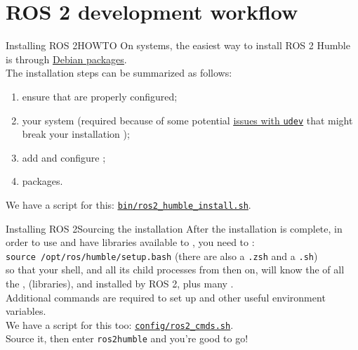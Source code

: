 
\section{ROS 2 development workflow}
\graphicspath{{figs/section1/}}

\begin{frame}{Installing ROS 2}{HOWTO}
  On  systems, the easiest way to install ROS 2 Humble is through \href{https://docs.ros.org/en/humble/Installation/Ubuntu-Install-Debians.html}{\color{blue}\underline{Debian packages}}.\\
  \bigskip
  The installation steps can be summarized as follows:
  \begin{enumerate}
    \item ensure that  are properly configured;
    \item {} your system (required because of some potential \href{https://github.com/ros2/ros2/issues/1272}{\color{blue}\underline{issues with \texttt{udev}}} that might break your installation \smiley);
    \item add and configure ;
    \item {} packages.
  \end{enumerate}
  We have a script for this: \href{https://github.com/IntelligentSystemsLabUTV/ros2-examples/blob/humble/bin/ros2_humble_install.sh}{\color{blue}\underline{\texttt{bin/ros2\_humble\_install.sh}}}.
\end{frame}
\begin{frame}{Installing ROS 2}{Sourcing the installation}
  After the installation is complete, in order to use  and have libraries available to , you need to :\\
  \bigskip
  \texttt{source /opt/ros/humble/setup.bash} (there are also a \texttt{.zsh} and a \texttt{.sh})\\
  \bigskip
  so that your shell, and all its child processes from then on, will know the  of all the ,  (libraries), and  installed by ROS 2, plus many .\\
  \bigskip
  Additional commands are required to set up  and other useful environment variables.\\
  We have a script for this too: \href{https://github.com/IntelligentSystemsLabUTV/ros2-examples/blob/humble/config/ros2_cmds.sh}{\color{blue}\underline{\texttt{config/ros2\_cmds.sh}}}.\\
  Source it, then enter \texttt{ros2humble} and you're good to go!
\end{frame}


